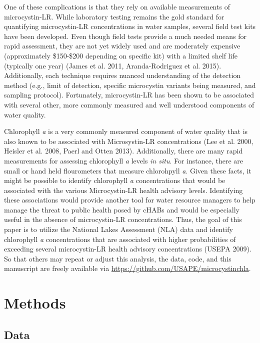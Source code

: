 \documentclass[11pt,]{article}
\begin{document}
One of these complications is that they rely on available measurements
of microcystin-LR. While laboratory testing remains the gold standard
for quantifying microcystin-LR concentrations in water samples, several
field test kits have been developed. Even though field tests provide a
much needed means for rapid assessment, they are not yet widely used and
are moderately expensive (approximately \$150-\$200 depending on
specific kit) with a limited shelf life (typically one year) (James et
al. 2011, Aranda-Rodriguez et al. 2015). Additionally, each technique
requires nuanced understanding of the detection method (e.g., limit of
detection, specific microcystin variants being measured, and sampling
protocol). Fortunately, microcystin-LR has been shown to be associated
with several other, more commonly measured and well understood
components of water quality.

Chlorophyll \emph{a} is a very commonly measured component of water
quality that is also known to be associated with Microsystin-LR
concentrations (Lee et al. 2000, Heisler et al. 2008, Paerl and Otten
2013). Additionally, there are many rapid measurements for assessing
chlorophyll \emph{a} levels \emph{in situ}. For instance, there are
small or hand held flourometers that measure chlorohpyll \emph{a}. Given
these facts, it might be possible to identify chlorophyll \emph{a}
concentrations that would be associated with the various Microcystin-LR
health advisory levels. Identifying these associations would provide
another tool for water resource managers to help manage the threat to
public health posed by cHABs and would be especially useful in the
absence of microcystin-LR concentrations. Thus, the goal of this paper
is to utilize the National Lakes Assessment (NLA) data and identify
chlorophyll \emph{a} concentrations that are associated with higher
probabilities of exceeding several microcystin-LR health advisory
concentrations (USEPA 2009). So that others may repeat or adjust this
analysis, the data, code, and this manuscript are freely available via
\href{https://github.com/USAPE/microcystinchla}{\url{https://github.com/USAPE/microcystinchla}}.

\section{Methods}\label{methods}

\subsection{Data}\label{data}
\end{document}
